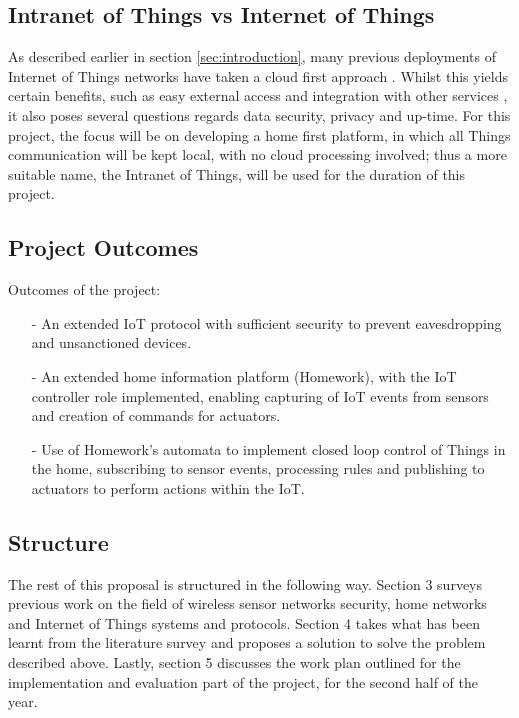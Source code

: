 \documentclass{mprop}
\begin{document}
\subsection{Intranet of Things vs Internet of Things} %
\label{sub:intranet_of_things}

As described earlier in section \ref{sec:introduction}, many previous deployments of Internet of Things networks have taken a cloud first approach \cite{SmartThings, Twine}. Whilst this yields certain benefits, such as easy external access and integration with other services \cite{IFTTT, Xively}, it also poses several questions regards data security, privacy and up-time. For this project, the focus will be on developing a home first platform, in which all Things communication will be kept local, with no cloud processing involved; thus a more suitable name, the Intranet of Things, will be used for the duration of this project. 

\subsection{Project Outcomes} %
\label{sub:project_outcomes}

Outcomes of the project:
\begin{itemize}
  \item[-] An extended IoT protocol with sufficient security to prevent eavesdropping and unsanctioned devices.
  \item[-] An extended home information platform (Homework), with the IoT controller role implemented, enabling capturing of IoT events from sensors and creation of commands for actuators.
  \item[-] Use of Homework's automata to implement closed loop control of Things in the home, subscribing to sensor events, processing rules and publishing to actuators to perform actions within the IoT.
\end{itemize}


\subsection{Structure} %
\label{sub:structure}
The rest of this proposal is structured in the following way. Section 3 surveys previous work on the field of wireless sensor networks security, home networks and Internet of Things systems and protocols. Section 4 takes what has been learnt from the literature survey and proposes a solution to solve the problem described above. Lastly, section 5 discusses the work plan outlined for the implementation and evaluation part of the project, for the second half of the year.
\end{document}
